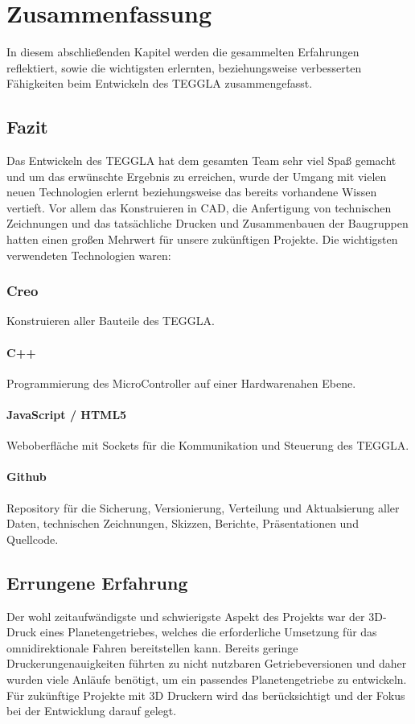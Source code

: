 \chapter{Zusammenfassung}
In diesem abschließenden Kapitel werden die gesammelten Erfahrungen reflektiert, sowie die wichtigsten erlernten, beziehungsweise verbesserten Fähigkeiten beim Entwickeln des TEGGLA zusammengefasst.


\section{Fazit}
Das Entwickeln des TEGGLA hat dem gesamten Team sehr viel Spaß gemacht und um das erwünschte Ergebnis zu erreichen, wurde der Umgang mit vielen neuen Technologien erlernt beziehungsweise das bereits vorhandene Wissen vertieft. 
Vor allem das Konstruieren in CAD, die Anfertigung von technischen Zeichnungen und das tatsächliche Drucken und Zusammenbauen der Baugruppen hatten einen großen Mehrwert für unsere zukünftigen Projekte. 
Die wichtigsten verwendeten Technologien waren:

\subsection*{Creo}
Konstruieren aller Bauteile des TEGGLA.

\subsubsection*{C++}
Programmierung des MicroController auf einer Hardwarenahen Ebene.

\subsubsection*{JavaScript / HTML5}
Weboberfläche mit Sockets für die Kommunikation und Steuerung des TEGGLA.

\subsubsection*{Github}
Repository für die Sicherung, Versionierung, Verteilung und Aktualsierung aller Daten, technischen Zeichnungen, Skizzen, Berichte, Präsentationen und Quellcode.


\section{Errungene Erfahrung}
Der wohl zeitaufwändigste und schwierigste Aspekt des Projekts war der 3D-Druck eines Planetengetriebes, welches die erforderliche Umsetzung für das omnidirektionale Fahren bereitstellen kann. Bereits geringe Druckerungenauigkeiten führten zu nicht nutzbaren Getriebeversionen und daher wurden viele Anläufe benötigt, um ein passendes Planetengetriebe zu entwickeln. Für zukünftige Projekte mit 3D Druckern wird das berücksichtigt und der Fokus bei der Entwicklung darauf gelegt.  

